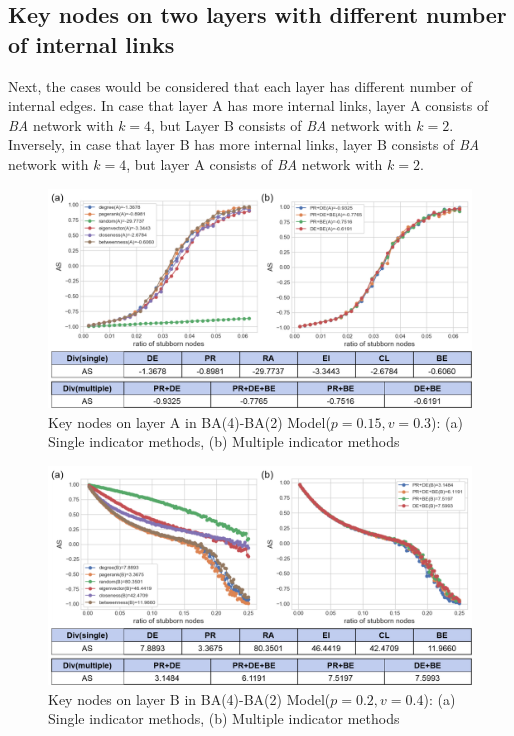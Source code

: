\subsection{Key nodes on two layers with different number of internal links}
Next, the cases would be considered that each layer has different number of internal edges. In case that layer A has more internal links, layer A consists of \textit{BA} network with $k=4$, but Layer B consists of \textit{BA} network with $k=2$. Inversely, in case that layer B has more internal links, layer B consists of \textit{BA} network with $k=4$, but layer A consists of \textit{BA} network with $k=2$. 
\begin{figure}[!htb]
	\centering
	\includegraphics[width=\hsize]{figure/chap5_keynode_internal_A.png}
	\caption{Key nodes on layer A in BA(4)-BA(2) Model($p=0.15, v=0.3$):
		(a) Single indicator methods, (b) Multiple indicator methods}
	\label{chap5_keynode_internal_A}
\end{figure}
\begin{figure}[!htb]
	\centering
	\includegraphics[width=\hsize]{figure/chap5_keynode_internal_B.png}
	\caption{Key nodes on layer B in BA(4)-BA(2) Model($p=0.2, v=0.4$):
		(a) Single indicator methods, (b) Multiple indicator methods}
	\label{chap5_keynode_internal_B}
\end{figure}
